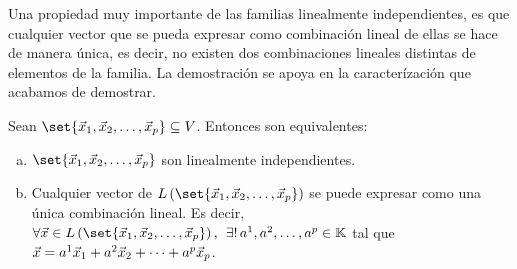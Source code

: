 \documentclass[../algebra_lineal.tex]{subfiles}
\begin{document}
Una propiedad muy importante de las familias linealmente independientes, es que cualquier vector que se pueda expresar como combinación lineal de ellas se hace de manera única, es decir, no existen dos combinaciones lineales distintas de elementos de la familia. La demostración se apoya en la caracterízación que acabamos de demostrar.

\begin{proposition}
    Sean $\set{\vlst{x}{p}} \subseteq V$. Entonces son equivalentes:
    \begin{enumerate}[a)]
        \item $\set{\vlst{x}{p}}$ son linealmente independientes.
        \item Cualquier vector de $\lspan{\set{\vlst{x}{p}}}$ se puede expresar como una única combinación lineal.  Es decir, $\forall \vx \in \lspan{\set{\vlst{x}{p}}}, \spc \exists! \, \slst{a}{p} \in \K$ tal que $\vec{x} = {a}^{1}\vec{x}_{1}+{a}^{2}\vec{x}_{2}+\dots+{a}^{p}\vec{x}_{p}$. 
    \end{enumerate}
\end{proposition}
\end{document}
